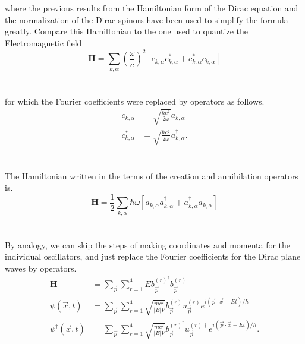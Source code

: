\documentclass{report}
\begin{document}
\\
\\
where the previous results from the Hamiltonian form of the Dirac equation and the normalization of the Dirac spinors have been used to simplify the formula greatly. Compare this Hamiltonian to the one used to quantize the Electromagnetic field
\begin{equation}
	\mathbf{H} = \sum_{k, \alpha} \left( \frac{\omega}{c} \right)^2 \left[ c_{k, \alpha} c^{*}_{k, \alpha} + c^{*}_{k, \alpha} c_{k, \alpha} \right]
\end{equation}
\\
\\
for which the Fourier coefficients were replaced by operators as follows.
\begin{align*}
	c_{k, \alpha}     & = \sqrt{\frac{\hbar c^2}{2\omega}} a_{k, \alpha}           \\
	c^{*}_{k, \alpha} & = \sqrt{\frac{\hbar c^2}{2\omega}} a^{\dagger}_{k, \alpha}
	.\end{align*}
\\
\\
The Hamiltonian written in the terms of the creation and annihilation operators is.
\begin{equation}
	\mathbf{H} = \frac{1}{2} \sum_{k, \alpha} \hbar \omega \left[ a_{k, \alpha} a^{\dagger}_{k, \alpha} + a^{\dagger}_{k, \alpha} a_{k, \alpha} \right]
\end{equation}
\\
\\
By analogy, we can skip the steps of making coordinates and momenta for the individual oscillators, and just replace the Fourier coefficients for the Dirac plane waves by operators.
\begin{align*}
	\mathbf{H}                               & = \sum_{\vec{p}} \sum_{r = 1}^{4} E b^{(r)^{\dagger}}_{\vec{p}} b^{(r)}_{\vec{p}}                                                                                                     \\
	\psi \left( \vec{x}, t \right)           & = \sum_{\vec{p}} \sum_{r = 1}^{4} \sqrt{\frac{mc^2}{\left| E \right| V}} b^{(r)}_{\vec{p}} u^{(r)}_{\vec{p}} e^{i\left( \vec{p} \cdot \vec{x} - Et \right) / \hbar}                   \\
	\psi^{\dagger} \left( \vec{x}, t \right) & = \sum_{\vec{p}} \sum_{r = 1}^{4} \sqrt{\frac{mc^2}{\left| E \right| V}} b^{(r)^{\dagger}}_{\vec{p}} u^{(r) \dagger}_{\vec{p}} e^{i\left( \vec{p} \cdot \vec{x} - Et \right) / \hbar}
	.\end{align*}
\end{document}
